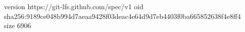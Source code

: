 version https://git-lfs.github.com/spec/v1
oid sha256:9189ce048b994d7aeaa9428f03deac4e64d9d7eb4403f0ba665852638f4e8ff4
size 6906
